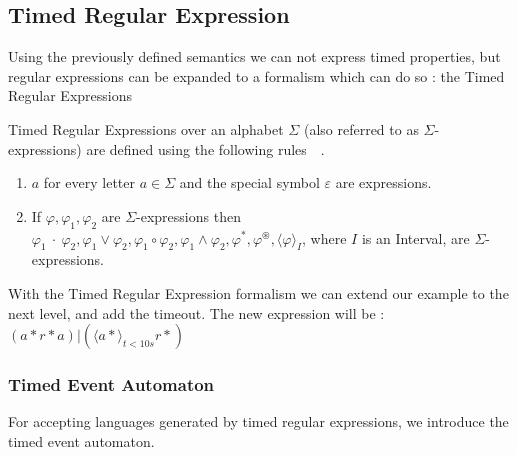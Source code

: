 			
		\subsection{Timed Regular Expression}
		
			Using the previously defined semantics we can not express timed properties,
			but regular expressions can be expanded to a formalism which can do so : 
			the Timed Regular Expressions
			

			\begin{dfn}
				\label{dfn:cep:tre}
				Timed Regular Expressions over an alphabet $\Sigma$ (also referred to as $\Sigma$-expressions)
				are defined using the following rules~\citep{tre}~.
				\begin{enumerate}
					\item \underline{$a$} for every letter $a \in \Sigma$ and the special symbol $\varepsilon$ are expressions.
					\item If $\varphi, \varphi_1, \varphi_2$ are $\Sigma$-expressions then %
						$ %
						\varphi_1~\cdot~\varphi_2,
						\varphi_1 \vee \varphi_2,
						\varphi_1 \circ \varphi_2,
						\varphi_1 \wedge \varphi_2,
						\varphi^\ast,
						\varphi^\circledast,
						\langle \varphi \rangle_I$, 
						where $I$ is an Interval, are $\Sigma$-expressions.
				\end{enumerate}
			\end{dfn}
			
			With the Timed Regular Expression formalism we can extend our example to the next level, and add the timeout.
			The new expression will be : $(a\ast r\ast a)|( \langle a \ast \rangle_{t < 10 s} r \ast)$
			
			\subsubsection{Timed Event Automaton}
				For accepting languages generated by timed regular expressions, we introduce the timed event automaton.
				
